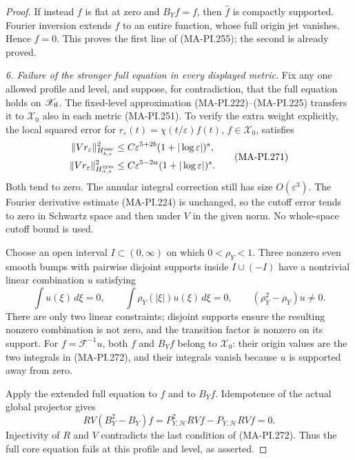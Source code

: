 \begin{proof}
If instead \(f\) is flat at zero and \(B_Yf=f\), then
\(\widehat f\) is compactly supported.  Fourier inversion
extends \(f\) to an entire function, whose full origin
jet vanishes.  Hence \(f=0\).  This proves the first
line of (MA-PI.255); the second is already proved.

\emph{6. Failure of the stronger full equation in every displayed metric.}
Fix any one allowed profile and level, and suppose, for
contradiction, that the full equation holds on
\(\mathscr X_{\rm fl}\).  The fixed-level approximation
(MA-PI.222)--(MA-PI.225) transfers it to \(\mathscr X_0\)
also in each metric (MA-PI.251).  To verify the extra
weight explicitly, the local squared error for
\(r_\varepsilon(t)=\chi(t/\varepsilon)f(t)\),
\(f\in\mathscr X_0\), satisfies
\[
 \begin{aligned}
 \|Vr_\varepsilon\|_{H^{\rm one}_{b,s}}^2
   &\le C\varepsilon^{5+2b}(1+|\log\varepsilon|)^s,\\
 \|Vr_\varepsilon\|_{H^{\rm sym}_{\alpha,s}}^2
   &\le C\varepsilon^{5-2\alpha}(1+|\log\varepsilon|)^s.
 \end{aligned}
 \tag{MA-PI.271}
\]
Both tend to zero.  The annular integral correction still
has size \(O(\varepsilon^3)\).  The Fourier derivative
estimate (MA-PI.224) is unchanged, so the cutoff error
tends to zero in Schwartz space and then under \(V\)
in the given norm.  No whole-space cutoff bound is used.

Choose an open interval \(I\subset(0,\infty)\) on which
\(0<\rho_Y<1\).  Three nonzero even smooth bumps with
pairwise disjoint supports inside \(I\cup(-I)\) have a
nontrivial linear combination \(u\) satisfying
\[
 \int u(\xi)\,d\xi=0,\qquad
 \int\rho_Y(|\xi|)u(\xi)\,d\xi=0,\qquad
       (\rho_Y^2-\rho_Y)u\ne0.
 \tag{MA-PI.272}
\]
There are only two linear constraints; disjoint supports
ensure the resulting nonzero combination is not zero,
and the transition factor is nonzero on its support.
For \(f=\mathcal F^{-1}u\), both \(f\) and \(B_Yf\)
belong to \(\mathscr X_0\): their origin values are the
two integrals in (MA-PI.272), and their integrals vanish
because \(u\) is supported away from zero.

Apply the extended full equation to \(f\) and to \(B_Yf\).
Idempotence of the actual global projector gives
\[
 R V(B_Y^2-B_Y)f
      =P_{Y,\mathscr H}^{2}RVf-P_{Y,\mathscr H}RVf=0.
 \tag{MA-PI.273}
\]
Injectivity of \(R\) and \(V\) contradicts the last
condition of (MA-PI.272).  Thus the full core equation
fails at this profile and level, as asserted.
\end{proof}

